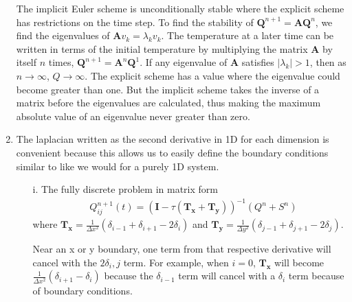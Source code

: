 \begin{enumerate}
	The implicit Euler scheme is unconditionally stable where the explicit scheme has restrictions on the time step.  To find the stability of $\mathbf{Q}^{n+1}=\mathbf{A}\mathbf{Q}^n$, we find the eigenvalues of $\mathbf{A} v_k=\lambda_k v_k$.  The temperature at a later time can be written in terms of the initial temperature by multiplying the matrix $\mathbf{A}$ by itself $n$ times, $\mathbf{Q}^{n+1}=\mathbf{A}^n\mathbf{Q}^1$. If any eigenvalue of $\mathbf{A}$ satisfies $|\lambda_k|>1$, then as $n \to \infty$, $Q \to \infty$.\cite{garcia2000numerical}
	The explicit scheme has a value where the eigenvalue could become greater than one.  But the implicit scheme takes the inverse of a matrix before the eigenvalues are calculated, thus making the maximum absolute value of an eigenvalue never greater than zero.
	\item The laplacian written as the second derivative in 1D for each dimension is convenient because this allows us to easily define the boundary conditions similar to like we would for a purely 1D system.  
	\begin{itemize}
		\item[i.]  The fully discrete problem in matrix form
		\begin{align*}
			& Q_{ij}^{n+1}(t) = (\mathbf{I}-\tau (\mathbf{T_x} + \mathbf{T_y}))^{-1} (Q^n+S^n) 
		\end{align*}
		where $\mathbf{T_{x}} = \frac{1}{\Delta x^2}(\delta_{i-1} + \delta_{i+1} - 2\delta_{i})$ and $\mathbf{T_{y}} = \frac{1}{\Delta y^2}(\delta_{j-1} + \delta_{j+1} - 2\delta_{j})$.  
		
		Near an x or y boundary, one term from that respective derivative will cancel with the $2 \delta_i,j$ term.  For example, when $i=0$, $\mathbf{T_{x}}$ will become $\frac{1}{\Delta x^2}( \delta_{i+1} - \delta_{i})$ because the $\delta_{i-1}$ term will cancel with a $\delta_{i}$ term because of boundary conditions.
	\end{itemize}
	

\end{enumerate}

